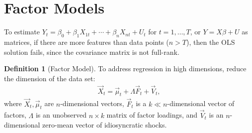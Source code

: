 \documentclass[11pt]{article}
\theoremstyle{definition}
\newtheorem{definition}{Definition}[section]
\theoremstyle{plain}
\theoremstyle{remark}
\begin{document}
\section{Factor Models}

To estimate $Y_t = \beta_0 + \beta_1 X_{1t}+\cdots+ \beta_nX_{nt}+U_t$ for $t= 1,\ldots,T$, or $Y = X\beta+U$ as matrices, if there are more features than data points ($n>T$), then the OLS solution fails, since the covariance matrix is not full-rank.

\begin{definition}[Factor Model]
    To address regression in high dimensions, reduce the dimension of the data set:
    \begin{align}
        \vec{X}_t = \vec{\mu}_t + \Lambda \vec{F}_t + \vec{V}_t,
    \end{align}
    where $\vec{X}_t, \vec{\mu}_t$ are $n$-dimensional vectors, $\vec{F}_t$ is a $k \ll n$-dimensional vector of factors, $\Lambda$ is an unobserved $n \times k$ matrix of factor loadings, and $\vec{V}_t$ is an $n$-dimensional zero-mean vector of idiosyncratic shocks.
\end{definition}
\end{document}
